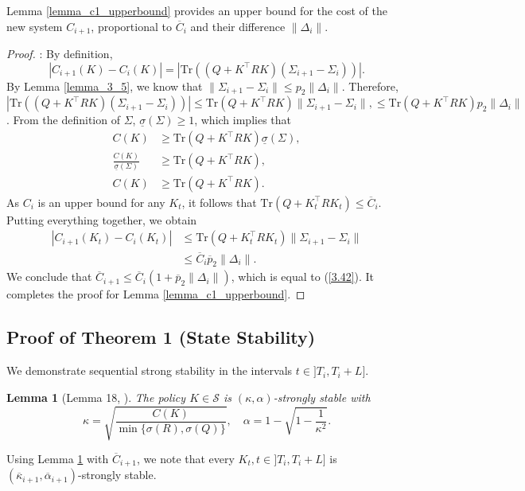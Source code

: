 \documentclass[letterpaper, 10 pt, conference]{ieeeconf}  %
\newtheorem{lemma}{Lemma}
\begin{document}
Lemma \ref{lemma_c1_upperbound} provides an upper bound for the cost of the new system $C_{i+1}$, proportional to $\overline{C}_i$ and their difference $\|\Delta_i\|$. \vspace{2mm} \\
\begin{proof}: By definition, 
$$
    |C_{i+1}(K) - C_i(K)| = \left|\text{Tr}\left( (Q+K^\top RK)(\Sigma_{i+1} - \Sigma_{i}) \right) \right|.
$$
By Lemma \ref{lemma_3_5}, we know that 
$
    \|\Sigma_{i+1} - \Sigma_i\| \leq p_2 \|\Delta_i\|.
$
Therefore, $\left|\text{Tr}\left( (Q+K^\top RK)(\Sigma_{i+1} - \Sigma_{i}) \right)\right| \leq \text{Tr}(Q+K^\top RK) \|\Sigma_{i+1} - \Sigma_{i}\|, \leq \text{Tr}(Q+K^\top RK) p_2 \|\Delta_i\|$.
From the definition of $\Sigma$,
$\underline{\sigma}(\Sigma) \geq 1$,
which implies that 
\begin{equation}
\begin{aligned}
    C(K) &\geq \text{Tr}(Q + K^\top RK) \underline{\sigma}(\Sigma), \\
    \frac{C(K)}{\underline{\sigma}(\Sigma)} &\geq \text{Tr}(Q + K^\top RK), \\
    C(K) &\geq \text{Tr}(Q + K^\top RK).
\end{aligned}
\end{equation}
As $C_i$ is an upper bound for any $K_t$, it follows that $\text{Tr}(Q + K_t^\top RK_t) \leq \overline{C}_i.$ Putting everything together, we obtain
\begin{equation}
\begin{aligned}
    |C_{i+1}(K_t) - C_i(K_t)| &\leq \text{Tr}(Q + K_t^\top RK_t) \|\Sigma_{i+1} - \Sigma_i\| \\ &\leq \overline{C}_i \overline{p}_2 \|\Delta_i\|.
\end{aligned}
\end{equation}
We conclude that 
$\overline{C}_{i+1} \leq \overline{C}_i (1+\overline{p}_2 \|\Delta_i\|)$,
which is equal to (\ref{3.42}). It completes the proof for Lemma \ref{lemma_c1_upperbound}.
\end{proof}

\subsection{Proof of Theorem 1 (State Stability)}
We demonstrate sequential strong stability in the intervals $t \in ]T_i, T_i +L]$. 

\begin{lemma}[Lemma 18, \cite{zhao2025policy}]
\label{str_stab}
The policy \( K \in \mathcal{S} \) is \((\kappa, \alpha)\)-strongly stable with
\[
\kappa = \sqrt{ \frac{C(K)}{ \min\{ \sigma(R), \sigma(Q) \} } }, \quad \alpha = 1 - \sqrt{1 - \frac{1}{\kappa^2}}.
\]    
\end{lemma} \vspace{2mm}
Using Lemma \ref{str_stab} with $\overline{C}_{i+1}$, we note that every $K_t, t \in ]T_i, T_i+L]$ is $(\overline{\kappa}_{i+1}, \overline{\alpha}_{i+1})$-strongly stable. 
\end{document}
